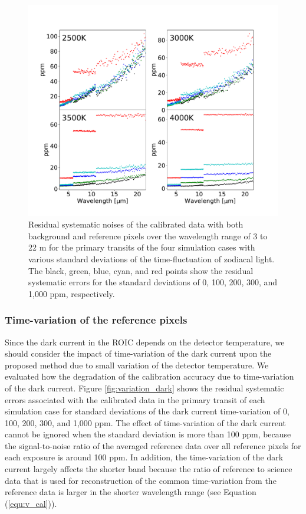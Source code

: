 \documentclass{aastex62}
\begin{document}
\begin{figure}[H]
\begin{center}
\includegraphics[width=12cm]{variation_zodi.pdf}
\caption{Residual systematic noises of the calibrated data with both background and reference pixels over the wavelength range of 3 to 22 \textmu m for the primary transits of the four simulation cases with various standard deviations of the time-fluctuation of zodiacal light. The black, green, blue, cyan, and red points show the residual systematic errors for the standard deviations of 0, 100, 200, 300, and 1,000 ppm, respectively. \label{fig:variation_zodi}}
\end{center}
\end{figure}


\subsubsection{Time-variation of the reference pixels} \label{subsubsec:variation_dark}

Since the dark current in the ROIC depends on the detector temperature, we should consider the impact of time-variation of the dark current upon the proposed method due to small variation of the detector temperature. We evaluated how the degradation of the calibration accuracy due to time-variation of the dark current. Figure \ref{fig:variation_dark} shows the residual systematic errors associated with the calibrated data in the primary transit of each simulation case for standard deviations of the dark current time-variation of 0, 100, 200, 300, and 1,000 ppm. The effect of time-variation of the dark current cannot be ignored when the standard deviation is more than 100 ppm, because the signal-to-noise ratio of the averaged reference data over all reference pixels for each exposure is around 100 ppm. In addition, the time-variation of the dark current largely affects the shorter band because the ratio of reference to science data that is used for reconstruction of the common time-variation from the reference data is larger in the shorter wavelength range (see Equation (\ref{equ:v_cal})).
\end{document}
